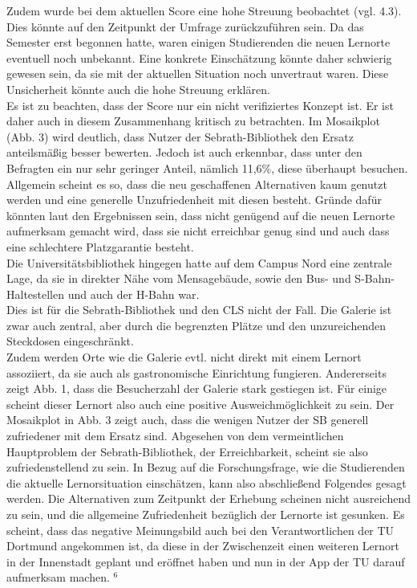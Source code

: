 \documentclass[11pt, a4paper]{article}
\begin{document}
Zudem wurde bei dem aktuellen Score eine hohe Streuung beobachtet (vgl. 4.3). Dies könnte auf den Zeitpunkt der Umfrage zurückzuführen sein. Da das Semester erst begonnen hatte, waren einigen Studierenden die neuen Lernorte eventuell noch unbekannt. Eine konkrete Einschätzung könnte daher schwierig gewesen sein, da sie mit der aktuellen Situation noch unvertraut waren. Diese Unsicherheit könnte auch die hohe Streuung erklären.\\
Es ist zu beachten, dass der Score nur ein nicht verifiziertes Konzept ist. Er ist daher auch in diesem Zusammenhang kritisch zu betrachten.
Im Mosaikplot (Abb. 3) wird deutlich, dass Nutzer der Sebrath-Bibliothek den Ersatz anteilsmäßig besser bewerten. Jedoch ist auch erkennbar, dass unter den Befragten ein nur sehr geringer Anteil, nämlich 11,6\%, diese überhaupt besuchen.\\
Allgemein scheint es so, dass die neu geschaffenen Alternativen kaum genutzt werden und eine generelle Unzufriedenheit mit diesen besteht. Gründe dafür könnten laut den Ergebnissen sein, dass nicht genügend auf die neuen Lernorte aufmerksam gemacht wird, dass sie nicht erreichbar genug sind und auch dass eine schlechtere Platzgarantie besteht.\\
Die Universitätsbibliothek hingegen hatte auf dem Campus Nord eine zentrale Lage, da sie in direkter Nähe vom Mensagebäude, sowie den Bus- und S-Bahn-Haltestellen und auch der H-Bahn war. \\
Dies ist für die Sebrath-Bibliothek und den CLS nicht der Fall. Die Galerie ist zwar auch zentral, aber durch die begrenzten Plätze und den unzureichenden Steckdosen eingeschränkt.\\
Zudem werden Orte wie die Galerie evtl. nicht direkt mit einem Lernort assoziiert, da sie auch als gastronomische Einrichtung fungieren.
Andererseits zeigt Abb. 1, dass die Besucherzahl der Galerie stark gestiegen ist.
Für einige scheint dieser Lernort also auch eine positive Ausweichmöglichkeit zu sein.
Der Mosaikplot in Abb. 3 zeigt auch, dass die wenigen Nutzer der SB generell zufriedener mit dem Ersatz sind. Abgesehen von dem vermeintlichen Hauptproblem der Sebrath-Bibliothek, der Erreichbarkeit, scheint sie also zufriedenstellend zu sein.
In Bezug auf die Forschungsfrage, wie die Studierenden die aktuelle Lernorsituation einschätzen, kann also abschließend Folgendes gesagt werden. Die Alternativen zum Zeitpunkt der Erhebung scheinen nicht ausreichend zu sein, und die allgemeine Zufriedenheit bezüglich der Lernorte ist gesunken.
Es scheint, dass das negative Meinungsbild auch bei den Verantwortlichen der TU Dortmund angekommen ist, da diese in der Zwischenzeit einen weiteren Lernort in der Innenstadt geplant und eröffnet haben und nun in der App der TU darauf aufmerksam machen. \hyperref[seitenverweis]{$^6$}
\end{document}
